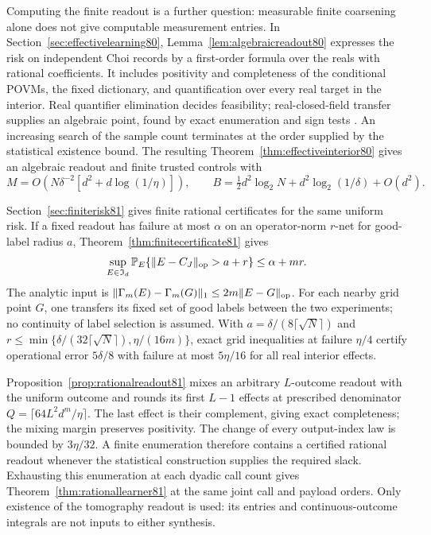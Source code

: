 Computing the finite readout is a further question: measurable
finite coarsening alone does not give computable measurement
entries.  In Section~\ref{sec:effectivelearning80},
Lemma~\ref{lem:algebraicreadout80} expresses the risk on
independent Choi records by a first-order formula over the reals
with rational coefficients.  It includes positivity and
completeness of the conditional POVMs, the fixed dictionary, and
quantification over every real target in the interior.  Real
quantifier elimination decides feasibility; real-closed-field
transfer supplies an algebraic point, found by exact enumeration
and sign tests \cite[Theorems~2.77 and~2.80 and Chapter~14]{BPR80}.
An increasing search of the sample count terminates at the order
supplied by the statistical existence bound.  The resulting
Theorem~\ref{thm:effectiveinterior80} gives an algebraic readout
and finite trusted controls with
\[
 M=O(N\delta^{-2}[d^2+d\log(1/\eta)]),\qquad
 B=\tfrac12d^2\log_2N+d^2\log_2(1/\delta)+O(d^2).
\]

Section~\ref{sec:finiterisk81} gives finite rational certificates
for the same uniform risk.  If a fixed readout has failure at most
$\alpha$ on an operator-norm $r$-net for good-label radius $a$,
Theorem~\ref{thm:finitecertificate81} gives
\[
 \sup_{E\in\mathfrak I_d}
   \mathbb P_E\{\|E-C_J\|_{\rm op}>a+r\}\le\alpha+mr.
\]
The analytic input is
$\|\Gamma_m(E)-\Gamma_m(G)\|_1\le2m\|E-G\|_{\rm op}$.
For each nearby grid point $G$, one transfers its fixed set of good
labels between the two experiments; no continuity of label
selection is assumed.  With
$a=\delta/(8\lceil\sqrt N\rceil)$ and
$r\le\min\{\delta/(32\lceil\sqrt N\rceil),\eta/(16m)\}$,
exact grid inequalities at failure $\eta/4$ certify operational
error $5\delta/8$ with failure at most $5\eta/16$ for all real
interior effects.

Proposition~\ref{prop:rationalreadout81} mixes an arbitrary
$L$-outcome readout with the uniform outcome and rounds its first
$L-1$ effects at prescribed denominator
$Q=\lceil64L^2d^m/\eta\rceil$.  The last effect is their
complement, giving exact completeness; the mixing margin preserves
positivity.  The change of every output-index law is bounded by
$3\eta/32$.  A finite enumeration therefore contains a certified
rational readout whenever the statistical construction supplies the
required slack.  Exhausting this enumeration at each dyadic call
count gives Theorem~\ref{thm:rationallearner81} at the same joint
call and payload orders.  Only existence of the tomography readout
is used: its entries and continuous-outcome integrals are not
inputs to either synthesis.

